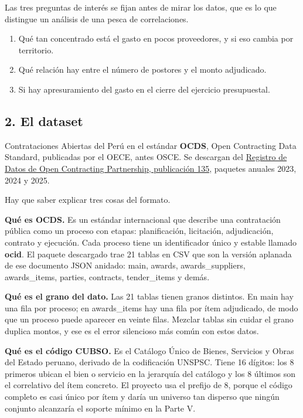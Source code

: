 \documentclass[11pt]{article}
\begin{document}
Las tres preguntas de interés se fijan antes de mirar los datos, que es lo que distingue un análisis de una pesca de correlaciones.

\begin{enumerate}
  \item Qué tan concentrado está el gasto en pocos proveedores, y si eso cambia por territorio.
  \item Qué relación hay entre el número de postores y el monto adjudicado.
  \item Si hay apresuramiento del gasto en el cierre del ejercicio presupuestal.
\end{enumerate}
\subsection*{2. El dataset}
Contrataciones Abiertas del Perú en el estándar \textbf{OCDS}, Open Contracting Data Standard, publicadas por el OECE, antes OSCE. Se descargan del \href{https://data.open-contracting.org/es/publication/135}{Registro de Datos de Open Contracting Partnership, publicación 135}, paquetes anuales 2023, 2024 y 2025.

Hay que saber explicar tres cosas del formato.

\textbf{Qué es OCDS.} Es un estándar internacional que describe una contratación pública como un proceso con etapas: planificación, licitación, adjudicación, contrato y ejecución. Cada proceso tiene un identificador único y estable llamado \textbf{ocid}. El paquete descargado trae 21 tablas en CSV que son la versión aplanada de ese documento JSON anidado: main, awards, awards\_\allowbreak{}suppliers, awards\_\allowbreak{}items, parties, contracts, tender\_\allowbreak{}items y demás.

\textbf{Qué es el grano del dato.} Las 21 tablas tienen granos distintos. En main hay una fila por proceso; en awards\_\allowbreak{}items hay una fila por ítem adjudicado, de modo que un proceso puede aparecer en veinte filas. Mezclar tablas sin cuidar el grano duplica montos, y ese es el error silencioso más común con estos datos.

\textbf{Qué es el código CUBSO.} Es el Catálogo Único de Bienes, Servicios y Obras del Estado peruano, derivado de la codificación UNSPSC. Tiene 16 dígitos: los 8 primeros ubican el bien o servicio en la jerarquía del catálogo y los 8 últimos son el correlativo del ítem concreto. El proyecto usa el prefijo de 8, porque el código completo es casi único por ítem y daría un universo tan disperso que ningún conjunto alcanzaría el soporte mínimo en la Parte V.
\end{document}
